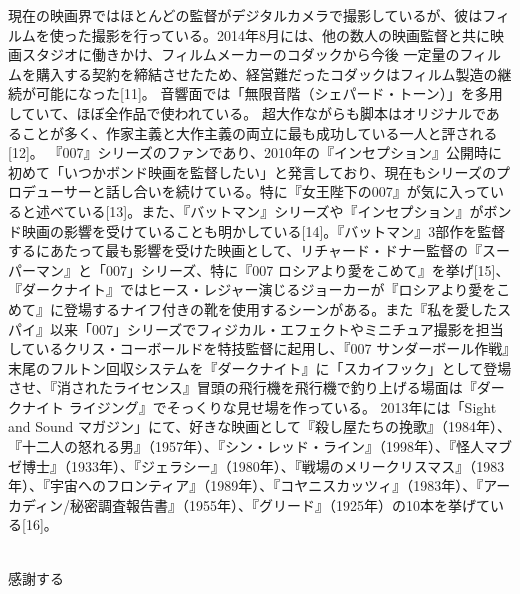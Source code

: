 \documentclass[paper]{ieicej}
\begin{document}
現在の映画界ではほとんどの監督がデジタルカメラで撮影しているが、彼はフィルムを使った撮影を行っている。2014年8月には、他の数人の映画監督と共に映画スタジオに働きかけ、フィルムメーカーのコダックから今後 一定量のフィルムを購入する契約を締結させたため、経営難だったコダックはフィルム製造の継続が可能になった[11]。
音響面では「無限音階（シェパード・トーン）」を多用していて、ほぼ全作品で使われている。
超大作ながらも脚本はオリジナルであることが多く、作家主義と大作主義の両立に最も成功している一人と評される[12]。
『007』シリーズのファンであり、2010年の『インセプション』公開時に初めて「いつかボンド映画を監督したい」と発言しており、現在もシリーズのプロデューサーと話し合いを続けている。特に『女王陛下の007』が気に入っていると述べている[13]。また、『バットマン』シリーズや『インセプション』がボンド映画の影響を受けていることも明かしている[14]。『バットマン』3部作を監督するにあたって最も影響を受けた映画として、リチャード・ドナー監督の『スーパーマン』と「007」シリーズ、特に『007 ロシアより愛をこめて』を挙げ[15]、『ダークナイト』ではヒース・レジャー演じるジョーカーが『ロシアより愛をこめて』に登場するナイフ付きの靴を使用するシーンがある。また『私を愛したスパイ』以来「007」シリーズでフィジカル・エフェクトやミニチュア撮影を担当しているクリス・コーボールドを特技監督に起用し、『007 サンダーボール作戦』末尾のフルトン回収システムを『ダークナイト』に「スカイフック」として登場させ、『消されたライセンス』冒頭の飛行機を飛行機で釣り上げる場面は『ダークナイト ライジング』でそっくりな見せ場を作っている。
2013年には「Sight and Sound マガジン」にて、好きな映画として『殺し屋たちの挽歌』（1984年）、『十二人の怒れる男』（1957年）、『シン・レッド・ライン』（1998年）、『怪人マブゼ博士』（1933年）、『ジェラシー』（1980年）、『戦場のメリークリスマス』（1983年）、『宇宙へのフロンティア』（1989年）、『コヤニスカッツィ』（1983年）、『アーカディン/秘密調査報告書』（1955年）、『グリード』（1925年）の10本を挙げている[16]。

\ack %
\\
感謝する

%
%
\begin{thebibliography}{99}%
\bibitem{}
\end{thebibliography}

\appendix
\section{}

\begin{biography}
\profile{}{}{}
\end{biography}
\end{document}
